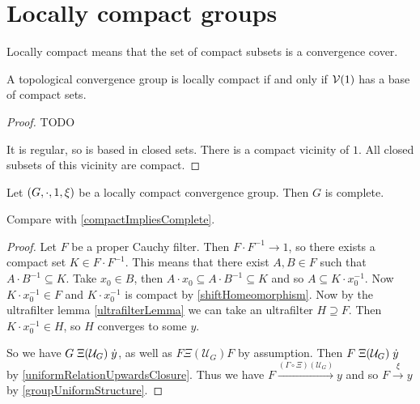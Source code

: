 \section{Locally compact groups}
Locally compact means that the set of compact subsets is a convergence cover.

\begin{lemma}
A topological convergence group is locally compact \textup{if and only if} $\operatorname{\mathcal{V}}(1)$ has a base of compact sets.
\end{lemma}
\begin{proof}
TODO 

It is regular, so is based in closed sets. There is a compact vicinity of $1$. All closed subsets of this vicinity are compact.
\end{proof}

\begin{proposition}
Let $\sSet{G, \cdot, 1, \xi}$ be a locally compact convergence group. Then $G$ is complete.
\end{proposition}
Compare with \ref{compactImpliesComplete}.
\begin{proof}
Let $F$ be a proper Cauchy filter. Then $F\cdot F^{-1} \to 1$, so there exists a compact set $K\in F\cdot F^{-1}$. This means that there exist $A, B \in F$ such that $A\cdot B^{-1} \subseteq K$. Take $x_0 \in B$, then $A\cdot x_0 \subseteq A\cdot B^{-1} \subseteq K$ and so $A \subseteq K\cdot x_0^{-1}$. Now $K\cdot x_0^{-1}\in F$ and $K\cdot x_0^{-1}$ is compact by \ref{shiftHomeomorphism}. Now by the ultrafilter lemma \ref{ultrafilterLemma} we can take an ultrafilter $H \supseteq F$. Then $K\cdot x_0^{-1} \in H$, so $H$ converges to some $y$.

So we have $G\mathrel{\Xi(\mathcal{U}_G)} \dot{y}$, as well as $F\mathrel{\Xi(\mathcal{U}_G)} F$ by assumption. Then $F\mathrel{\Xi(\mathcal{U}_G)} \dot{y}$ by \ref{uniformRelationUpwardsClosure}. Thus we have $F \overset{(\Gamma\circ \Xi)(\mathcal{U}_G)}{\longrightarrow} y$ and so $F\overset{\xi}{\longrightarrow} y$ by \ref{groupUniformStructure}.
\end{proof}

